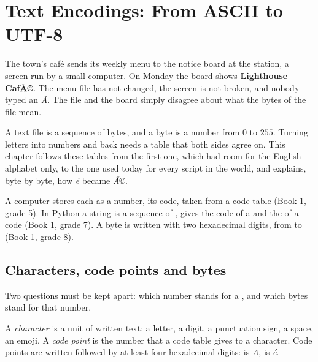 \chapter{Text Encodings: From ASCII to UTF-8}\label{ch:g10:text-encodings}

The town's café sends its weekly menu to the notice board at the station, a screen run by a small computer. On
Monday the board shows \textbf{Lighthouse CafÃ©}. The menu file has not changed, the screen is not broken, and nobody
typed an \textit{Ã}. The file and the board simply disagree about what the bytes of the file mean.

A text file is a sequence of bytes, and a byte is a number from $0$ to $255$. Turning letters into numbers and back
needs a table that both sides agree on. This chapter follows these tables from the first one, which had room for the
English alphabet only, to the one used today for every script in the world, and explains, byte by byte, how
\textit{é} became \textit{Ã©}.

\begin{recall}
A computer stores each  as a number, its code, taken from a code table (Book 1, grade 5). In Python a
string is a sequence of ,  gives the code of a  and  the  of a
code (Book 1, grade 7). A byte is written with two hexadecimal digits, from  to  (Book 1,
grade 8).
\end{recall}

\section{Characters, code points and bytes}\label{sec:g10:text-encodings:code-points}

Two questions must be kept apart: which number stands for a , and which bytes stand for that number.

\begin{definition}\label{def:g10:text-encodings:code-point}
A \emph{character} is a unit of written text: a letter, a digit, a punctuation sign, a space, an
emoji. A \emph{code point} is the number that a code table gives to a character. Code points are
written  followed by at least four hexadecimal digits:  is \textit{A},  is
\textit{é}.
\end{definition}

